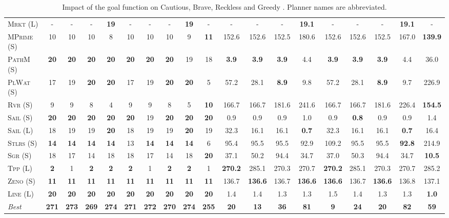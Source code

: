 \documentclass[11pt,landscape]{article}
\begin{document}
\begin{table}[tb]
{\begin{tabular}{|l||ccccccccc||ccccccccc||}
\textsc{Mrkt} (L)&-&-&-&\textbf{19}&-&-&-&\textbf{19}&-&-&-&-&\textbf{19.1}&-&-&-&\textbf{19.1}&-\\
\textsc{MPrime} (S)&10&10&10&8&10&10&10&9&\textbf{11}&152.6&152.6&152.5&180.6&152.6&152.6&152.5&167.0&\textbf{139.9}\\
\textsc{PathM} (S)&\textbf{20}&\textbf{20}&\textbf{20}&\textbf{20}&\textbf{20}&\textbf{20}&\textbf{20}&19&18&\textbf{3.9}&\textbf{3.9}&\textbf{3.9}&4.4&\textbf{3.9}&\textbf{3.9}&\textbf{3.9}&4.4&36.0\\
\textsc{PlWat} (S)&17&19&\textbf{20}&\textbf{20}&17&19&\textbf{20}&\textbf{20}&5&57.2&28.1&\textbf{8.9}&9.8&57.2&28.1&\textbf{8.9}&9.7&226.9\\
\textsc{Rvr} (S)&9&9&8&4&9&9&8&5&\textbf{10}&166.7&166.7&181.6&241.6&166.7&166.7&181.6&226.4&\textbf{154.5}\\
\textsc{Sail} (S)&\textbf{20}&\textbf{20}&\textbf{20}&\textbf{20}&\textbf{20}&19&\textbf{20}&\textbf{20}&\textbf{20}&0.9&0.9&0.9&1.0&0.9&\textbf{0.8}&0.9&0.9&1.4\\
\textsc{Sail} (L)&18&19&19&\textbf{20}&18&19&19&\textbf{20}&19&32.3&16.1&16.1&\textbf{0.7}&32.3&16.1&16.1&\textbf{0.7}&16.4\\
\textsc{Stlrs} (S)&\textbf{14}&\textbf{14}&\textbf{14}&\textbf{14}&13&\textbf{14}&\textbf{14}&\textbf{14}&6&95.4&95.5&95.5&92.9&109.2&95.5&95.5&\textbf{92.8}&214.9\\
\textsc{Sgr} (S)&18&17&14&18&18&17&14&18&\textbf{20}&37.1&50.2&94.4&34.7&37.0&50.3&94.4&34.7&\textbf{10.5}\\
\textsc{Tpp} (L)&\textbf{2}&1&\textbf{2}&\textbf{2}&\textbf{2}&1&\textbf{2}&\textbf{2}&1&\textbf{270.2}&285.1&270.3&270.7&\textbf{270.2}&285.1&270.3&270.7&285.2\\
\textsc{Zeno} (S)&\textbf{11}&\textbf{11}&\textbf{11}&\textbf{11}&\textbf{11}&\textbf{11}&\textbf{11}&\textbf{11}&\textbf{11}&136.7&\textbf{136.6}&136.7&\textbf{136.6}&\textbf{136.6}&136.7&\textbf{136.6}&136.8&137.1\\
\textsc{Line} (L)&\textbf{20}&\textbf{20}&\textbf{20}&\textbf{20}&\textbf{20}&\textbf{20}&\textbf{20}&\textbf{20}&\textbf{20}&1.4&1.4&1.3&1.3&1.5&1.4&1.3&1.3&\textbf{1.0}
\\\hline
\textit{Best}&\textbf{271}&\textbf{273}&\textbf{269}&\textbf{274}&\textbf{271}&\textbf{272}&\textbf{270}&\textbf{274}&\textbf{255}&\textbf{20}&\textbf{13}&\textbf{36}&\textbf{81}&\textbf{9}&\textbf{24}&\textbf{20}&\textbf{82}&\textbf{59}\\\hline

        \end{tabular}}
        \caption{Impact of the goal function on Cautious, Brave, Reckless and Greedy \pattyd. Planner names are abbreviated.}
        \label{tab:abl-gf}
        \end{table}
        
\end{document}
